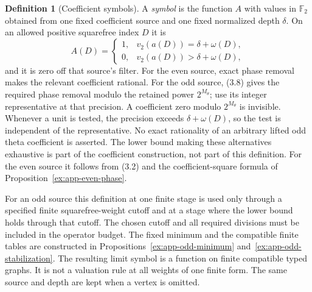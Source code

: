 \documentclass[11pt]{article}
\theoremstyle{definition}
\newtheorem{definition}[theorem]{Definition}
\theoremstyle{remark}
\newcommand{\F}{\mathbb F}
\begin{document}
\begin{definition}[Coefficient symbols]\label{ex:sec7-symbol}
A \emph{symbol} is the function $A$ with values in $\F_2$ obtained
from one fixed coefficient source and one fixed normalized depth
$\delta$. On an allowed positive squarefree index $D$ it is
\[
 A(D)=
 \begin{cases}
  1,&v_2(a(D))=\delta+\omega(D),\\
  0,&v_2(a(D))>\delta+\omega(D),
 \end{cases}
\]
and it is zero off that source's filter. For the even source, exact
phase removal makes the relevant coefficient rational. For the odd
source, (3.8) gives the required phase removal modulo the retained
power $2^{M_\theta}$; use its integer representative at that precision.
A coefficient zero modulo $2^{M_\theta}$ is invisible. Whenever a
unit is tested, the precision exceeds $\delta+\omega(D)$, so the test
is independent of the representative. No exact rationality of an
arbitrary lifted odd theta coefficient is asserted. The lower bound making these alternatives exhaustive
is part of the coefficient construction, not part of this definition.
For the even source it follows from (3.2) and the coefficient-square
formula of Proposition~\ref{ex:app-even-phase}.

For an odd source this definition at one finite stage is used only
through a specified finite squarefree-weight cutoff and at a stage
where the lower bound holds through that cutoff. The chosen cutoff
and all required divisions must be included in the operator budget.
The fixed minimum and the compatible finite tables are constructed
in Propositions~\ref{ex:app-odd-minimum} and~\ref{ex:app-odd-stabilization}.
The resulting limit symbol is a function on finite compatible typed
graphs. It is not a valuation rule at all weights of one finite form.
The same source and depth are kept when a vertex is omitted.
\end{definition}
\end{document}
